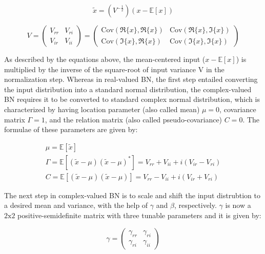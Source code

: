  \begin{equation}
\tilde{x} = (V^{-\frac{1}{2}})(x - \mathbb{E}[x])
\label{eqcbn1}
\end{equation}

 \begin{equation}
V = \begin{pmatrix} V_{rr} & V_{ri}\\ V_{ir} & V_{ii} \end{pmatrix} = 
\begin{pmatrix} \mathrm{Cov}(\Re{\{x\}},\Re{\{x\}}) & \mathrm{Cov}(\Re{\{x\}},\Im{\{x\}})\\  \mathrm{Cov}(\Im{\{x\}},\Re{\{x\}}) & \mathrm{Cov}(\Im{\{x\}},\Im{\{x\}}) \end{pmatrix}
\label{eqcbn2}
\end{equation}

As described by the equations above, the mean-centered input ($x - \mathbb{E}[x]$) is multiplied by the inverse of the square-root of input variance $\mathrm{V}$ in the normalization step. Whereas in real-valued BN, the first step entailed converting the input distribution into a standard normal distribution, the complex-valued BN requires it to be converted to standard complex normal distribution, which is characterized by having location parameter (also called mean) $\mu = 0$, covariance matrix $\Gamma = 1$, and the relation matrix (also called pseudo-covariance) $C = 0$. The formulae of these parameters are given by:

\begin{equation}
\label{eqcbn3}
\begin{aligned}
&\mu = \mathbb{E}[\tilde{x}]&\\
&\Gamma = \mathbb{E}[(\tilde{x}-\mu)(\tilde{x}-\mu)^{*}] = V_{rr} + V_{ii} + i (V_{ir} - V_{ri} )&\\
&C = \mathbb{E}[(\tilde{x}-\mu)(\tilde{x}-\mu)] = V_{rr} - V_{ii} + i (V_{ir} + V_{ri} )&
\end{aligned}
\end{equation}

The next step in complex-valued BN is to scale and shift the input distrubtion to a desired mean and variance, with the help of $\gamma$ and $\beta$, respectively. $\gamma$ is now a $\mathrm{2} \mathrm{x} \mathrm{2}$ positive-semidefinite matrix with three tunable parameters and it is given by:

\begin{equation}
\gamma = \begin{pmatrix} \gamma_{rr} & \gamma_{ri}\\ \gamma_{ri} & \gamma_{ii} \end{pmatrix} 
\label{eqcbn4}
\end{equation}

